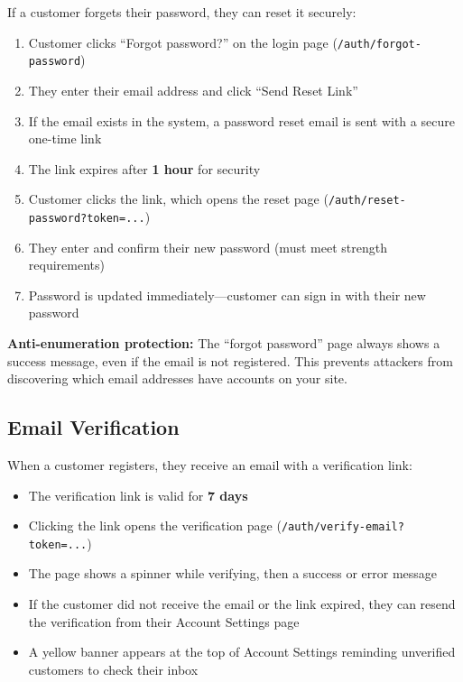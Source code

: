 \documentclass[12pt, letterpaper, oneside]{book}
\begin{document}
If a customer forgets their password, they can reset it securely:

\begin{enumerate}[leftmargin=2em]
  \item Customer clicks ``Forgot password?'' on the login page (\texttt{/auth/forgot-password})
  \item They enter their email address and click ``Send Reset Link''
  \item If the email exists in the system, a password reset email is sent with a secure one-time link
  \item The link expires after \textbf{1 hour} for security
  \item Customer clicks the link, which opens the reset page (\texttt{/auth/reset-password?token=...})
  \item They enter and confirm their new password (must meet strength requirements)
  \item Password is updated immediately---customer can sign in with their new password
\end{enumerate}

\begin{tipbox}
\textbf{Anti-enumeration protection:} The ``forgot password'' page always shows a success message, even if the email is not registered. This prevents attackers from discovering which email addresses have accounts on your site.
\end{tipbox}

\subsection*{Email Verification}

When a customer registers, they receive an email with a verification link:

\begin{itemize}[leftmargin=2em]
  \item The verification link is valid for \textbf{7 days}
  \item Clicking the link opens the verification page (\texttt{/auth/verify-email?token=...})
  \item The page shows a spinner while verifying, then a success or error message
  \item If the customer did not receive the email or the link expired, they can resend the verification from their Account Settings page
  \item A yellow banner appears at the top of Account Settings reminding unverified customers to check their inbox
\end{itemize}
\end{document}
